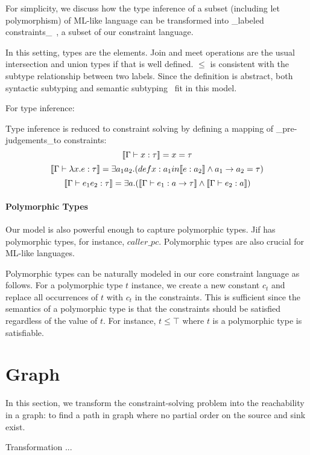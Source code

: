 For simplicity, we discuss how the type inference of a subset
(including let polymorphism) of ML-like language can be transformed
into _labeled constraints_~\cite{haack:slicing}, a subset of our
constraint language.

In this setting, types are the elements. Join and
meet operations are the usual intersection and union types if that is
well defined.
$\leq$ is consistent with the subtype relationship between two labels.
Since the definition is abstract, both syntactic subtyping 
and semantic subtyping~\cite{aiken-typeinclusion} fit in this model.

For type inference:

Type inference is reduced to constraint solving by defining a mapping
of _pre-judgements_to constraints:
\[\llbracket \Gamma \vdash x:\tau \rrbracket = x =\tau\]
\[\llbracket \Gamma \vdash \lambda x.e:\tau \rrbracket = \exists a_1 a_2.
(def x: a_1 in \llbracket e:a_2 \rrbracket \land a_1 \rightarrow a_2 =\tau)\]
\[\llbracket \Gamma\vdash e_1 e_2 : \tau \rrbracket = \exists a.(\llbracket \Gamma \vdash
e_1:a\rightarrow \tau \rrbracket\land \llbracket \Gamma\vdash e_2:a \rrbracket)\]


\paragraph{Polymorphic Types}

Our model is also powerful enough to capture polymorphic types.  Jif
has polymorphic types, for instance, $caller\_pc$. Polymorphic types
are also crucial for ML-like languages.

Polymorphic types can be naturally modeled in our core constraint
language as follows. For a polymorphic type $t$ instance, we create a
new constant $c_t$ and replace all occurrences of $t$ with $c_t$ in
the constraints. This is sufficient since the semantics of a
polymorphic type is that the constraints should be satisfied
regardless of the value of $t$. For instance, $t\leq \top$ where $t$
is a polymorphic type is satisfiable.

\section{Graph} 

In this section, we transform the constraint-solving problem into the
reachability in a graph: to find a path in graph where no partial order on the
source and sink exist. 

Transformation ... 

